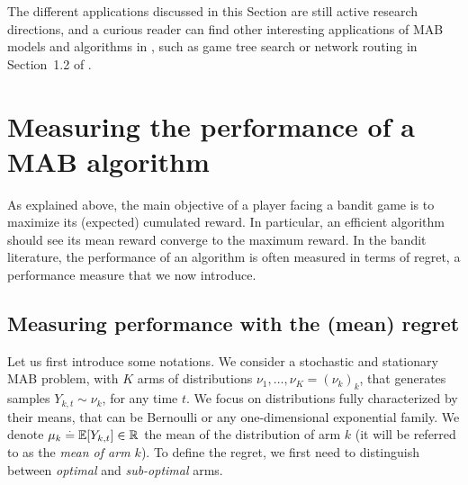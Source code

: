 The different applications discussed in this Section are still active research directions,
and a curious reader can find other interesting applications of MAB models and algorithms in \cite{bouneffouf2019survey}, such as game tree search or network routing in Section~1.2 of \cite{LattimoreBanditAlgorithmsBook}.


\section{Measuring the performance of a MAB algorithm}
\label{sec:2:lowerUpperBoundsRegret}

As explained above, the main objective of a player facing a bandit game is to maximize its (expected) cumulated reward.
%
In particular, an efficient algorithm should see its mean reward converge to the maximum reward.
In the bandit literature, the performance of an algorithm is often measured in terms of regret, a performance measure that we now introduce.


\subsection{Measuring performance with the (mean) regret}

Let us first introduce some notations.
We consider a stochastic and stationary MAB problem, with $K$ arms of distributions $\nu_1,\dots,\nu_K=(\nu_k)_k$, that generates \iid{} samples $Y_{k,t} \sim \nu_k$, for any time $t$.
We focus on distributions fully characterized by their means, that can be Bernoulli or any one-dimensional exponential family.
We denote $\mu_k \overset{.}{=} \mathbb{E}[Y_{k,t}] \in \mathbb{R}$ the mean of the distribution of arm $k$ (it will be referred to as the \emph{mean of arm $k$}).
%
%
To define the regret, we first need to distinguish between \emph{optimal} and \emph{sub-optimal} arms.

